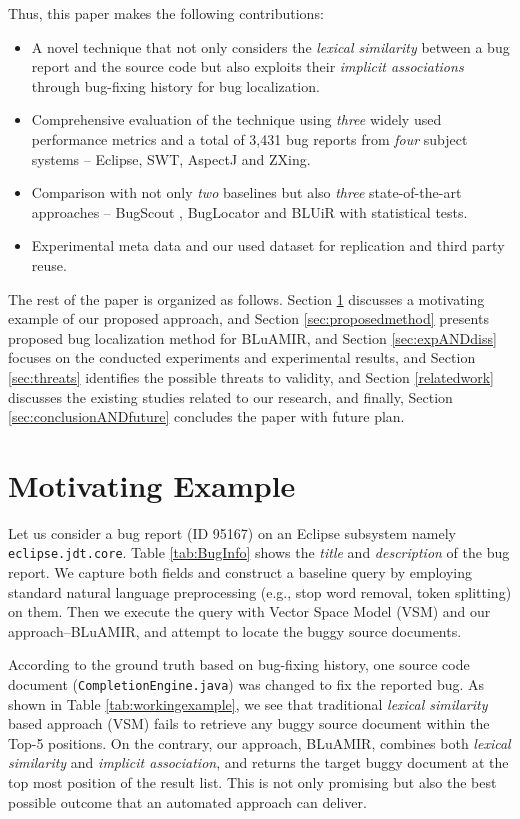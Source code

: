 \documentclass[conference]{IEEEtran}
\begin{document}
Thus, this paper makes the following contributions:
\begin{itemize}
	\item A novel technique that not only considers the \emph{lexical similarity} between a bug report and the source code but also exploits their \emph{implicit associations} through bug-fixing history for bug localization.
	\item Comprehensive evaluation of the technique using \emph{three} widely used performance metrics and a total of 3,431 bug reports from \emph{four} subject systems -- Eclipse, SWT, AspectJ and ZXing.
	\item Comparison with not only \emph{two} baselines \cite{vector-space-model,MarcusLSI} but also \emph{three} state-of-the-art approaches -- BugScout \cite{Nguyen}, BugLocator \cite{Jian} and BLUiR \cite{Saha} with statistical tests.
	\item Experimental meta data and our used dataset for  replication and third party reuse.
\end{itemize}

The rest of the paper is organized as follows. Section \ref{sec:motivatingexample} discusses a motivating example of our proposed approach, and Section \ref{sec:proposedmethod} presents proposed bug localization method for BLuAMIR, and Section \ref{sec:expANDdiss} focuses on the conducted experiments and experimental results, and Section \ref{sec:threats} identifies the possible threats to validity, and Section \ref{relatedwork}
discusses the existing studies related to our research, and finally,  
Section \ref{sec:conclusionANDfuture} concludes the paper with future plan.
\section{Motivating Example}\label{sec:motivatingexample}
Let us consider a bug report (ID 95167) on an Eclipse subsystem namely \texttt{eclipse.jdt.core}. Table \ref{tab:BugInfo} shows the \textit{title} and \textit{description} of the bug report. We capture both fields and construct a baseline query by employing standard natural language preprocessing (e.g., stop word removal, token splitting) on them. Then we execute the query with Vector Space Model (VSM) and our approach--BLuAMIR, and attempt to locate the buggy source documents.

According to the ground truth based on bug-fixing history, one source code document (\texttt{CompletionEngine.java}) was changed to fix the reported bug. 
As shown in Table \ref{tab:workingexample}, we see that traditional \emph{lexical similarity} based approach (VSM) fails to retrieve any buggy source document within the Top-5 positions. On the contrary, our approach, BLuAMIR, combines both \emph{lexical similarity} and \emph{implicit association}, and returns the target buggy document at the top most position of the result list. This is not only promising but also the best possible outcome that an automated approach can deliver.   
\end{document}
